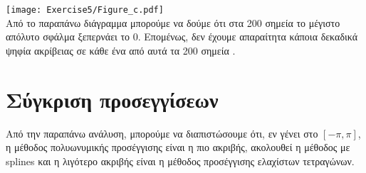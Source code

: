 \documentclass[a4paper,11pt]{article}
\newcommand{\lt}{\latintext}
\begin{document}
\texttt{[image: Exercise5/Figure\_c.pdf]}\\
Από το παραπάνω διάγραμμα μπορούμε να δούμε ότι στα 200 σημεία το μέγιστο απόλυτο σφάλμα ξεπερνάει το 0. Επομένως, δεν έχουμε απαραίτητα κάποια δεκαδικά ψηφία ακρίβειας σε κάθε ένα από αυτά τα 200 σημεία .

\section{Σύγκριση προσεγγίσεων}
Από την παραπάνω ανάλυση, μπορούμε να διαπιστώσουμε ότι, εν γένει στο $[-\pi, \pi]$, η μέθοδος πολυωνυμικής προσέγγισης είναι η πιο ακριβής, ακολουθεί η μέθοδος με {\lt splines} και η λιγότερο ακριβής είναι η μέθοδος προσέγγισης ελαχίστων τετραγώνων.
\end{document}
